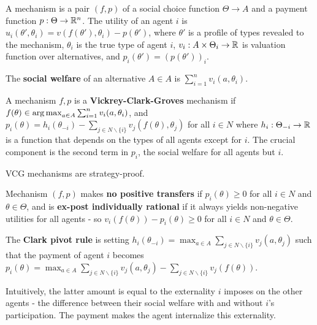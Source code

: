 \begin{defn}
  \label{sec:mech-with-paym-1}
  A mechanism is a pair $(f, p)$ of a social choice function $\Theta
  \rightarrow A$ and a payment function $p: \Theta \rightarrow
  \mathbb{R}^{n}$.  The utility of an agent $i$ is $u_{i}(\theta', \theta_{i})
  = v(f(\theta'), \theta_{i}) - p(\theta')$, where $\theta'$ is a
  profile of types revealed to the mechanism, $\theta_{i}$ is the true
  type of agent $i$, $v_{i}: A \times \Theta_{i} \rightarrow \mathbb{R}$ is
  valuation function over alternatives, and $p_{i}(\theta') =
  (p(\theta'))_{i}$.

  The \textbf{social welfare} of an alternative $A \in A$ is
  $\sum_{i=1}^{n} v_{i}(a, \theta_{i})$.
\end{defn}

\begin{defn}
  \label{sec:mech-with-paym-2}
  A mechanism $f, p$ is a \textbf{Vickrey-Clark-Groves} mechanism if
  $f(\theta) \in \operatorname*{arg\,max}_{a \in A} \sum_{i=1}^{n} v_{i}(a,
  \theta_{i})$, and $p_{i}(\theta) = h_{i}(\theta_{-i}) - \sum_{j \in
    N \backslash \{ i \} }^{} v_{j}(f(\theta), \theta_{j})$ for all $i
  \in N$ where $h_{i}: \Theta_{-i} \rightarrow \mathbb{R}$ is a function that
  depends on the types of all agents except for $i$.  The crucial
  component is the second term in $p_{i}$, the social welfare for all
  agents but $i$.

\end{defn}

\begin{thm}
  \label{sec:mech-with-paym-3}
  VCG mechanisms are strategy-proof.
\end{thm}

\begin{defn}
  \label{sec:mech-with-paym-4}
  Mechanism $(f, p)$ makes \textbf{no positive transfers} if
  $p_{i}(\theta) \geq 0$ for all $i \in N$ and $\theta \in \Theta$,
  and is \textbf{ex-post individually rational} if it always yields
  non-negative utilities for all agents - so $v_{i}(f(\theta)) -
  p_{i}(\theta) \geq 0$ for all $i \in N$ and $\theta \in \Theta$.

  The \textbf{Clark pivot rule} is setting $h_{i}(\theta_{-i}) =
  \max_{a \in A} \sum_{j \in N \backslash \{ i \} }^{} v_{j}(a,
  \theta_{j})$ such that the payment of agent $i$ becomes
  $p_{i}(\theta) = \max_{a \in A} \sum_{j \in N \backslash \{ i \}
  }^{} v_{j}(a, \theta_{j}) - \sum_{j \in N \backslash \{ i \}}
  v_{j}(f(\theta))$.

  Intuitively, the latter amount is equal to the externality $i$
  imposes on the other agents - the difference between their social
  welfare with and without $i$'s participation.  The payment makes the
  agent internalize this externality.
\end{defn}

